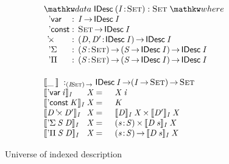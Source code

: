 \begin{figure}

\[\stk{
\begin{array}{ll}
\stk{
\data \IDesc{(\Bhab{\V{I}}{\Set})} : \Set \where \\
\;\;\begin{array}{@{}l@{\::\:\:}l@{\quad}l}
    \DVar{\!}         & \V{I} \To \IDesc{\V{I}}                                       \\
    \DConst{\!}       & \Set \To \IDesc{\V{I}}                                        \\
    \DProd{\!}{\!}    & \PI{\V{\V{D}}, \V{\V{D'}}}{\IDesc{\V{I}}} \IDesc{\V{I}}       \\
    \DSigma{\!}{\!}   & \PI{\V{S}}{\Set} \PIS{\V{S} \To \IDesc{\V{I}}} \IDesc{\V{I}}  \\
    \DPi{\!}{\!}      & \PI{\V{S}}{\Set} \PIS{\V{S} \To \IDesc{\V{I}}} \IDesc{\V{I}} 
\end{array}
}
\vspace{0.2in}
\\
\stk{
\idescop{\_\:}{}{} :_{\PI{\V{I}}{\Set}} \IDesc{\V{I}} \To (\V{\V{I}} \To \Set) \To \Set                  \\
\begin{array}{@{}l@{\V{X}}@{\:=\:\:}ll}
\idescop{\DVar{\V{i}}}{\V{I}}{&}      &  \V{X}\: \V{i}                                           \\
\idescop{\DConst{\V{K}}}{\V{I}}{&}    &  \V{K}                                                   \\
\idescop{\DProd{\V{D}}{\V{D'}}}{\V{I}}{&} &  \TIMES{\idescop{\V{D}}{\V{I}}{\V{X}}}{\idescop{\V{D'}}{\V{I}}{\V{X}}}       \\
\idescop{\DSigma{\V{S}}{\V{D}}}{\V{I}}{&} &  \SIGMA{\V{s}}{\V{S}} \idescop{\V{D}\: \V{s}}{\V{I}}{\V{X}}                    \\
\idescop{\DPi{\V{S}}{\V{D}}}{\V{I}}{&}    &  \PI{\V{s}}{\V{S}} \idescop{\V{D}\: \V{s}}{\V{I}}{\V{X}}            
\end{array}
}
\end{array}
}\]

\caption{Universe of indexed description}
\label{fig:idesc}

\end{figure}


